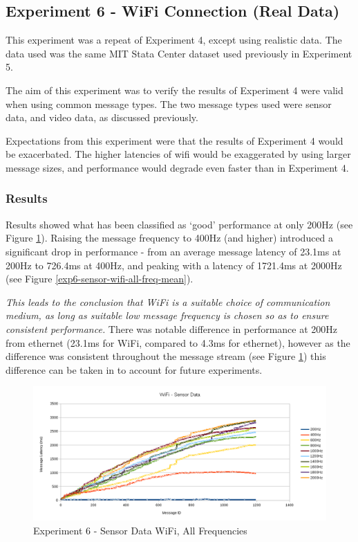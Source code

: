 \documentclass[../dissertation.tex]{subfiles}
\begin{document}
\subsection{Experiment 6 - WiFi Connection (Real Data)}

This experiment was a repeat of Experiment 4, except using realistic data. The data used was the same MIT Stata Center dataset used previously in Experiment 5.

The aim of this experiment was to verify the results of Experiment 4 were valid when using common message types. The two message types used were sensor data, and video data, as discussed previously.

Expectations from this experiment were that the results of Experiment 4 would be exacerbated. The higher latencies of wifi would be exaggerated by using larger message sizes, and performance would degrade even faster than in Experiment 4.

\subsubsection{Results}

Results showed what has been classified as `good' performance at only 200Hz (see Figure \ref{exp6-sensor-wifi-all-freq-stream}). Raising the message frequency to 400Hz (and higher) introduced a significant drop in performance - from an average message latency of 23.1ms at 200Hz to 726.4ms at 400Hz, and peaking with a latency of 1721.4ms at 2000Hz (see Figure \ref{exp6-sensor-wifi-all-freq-mean}).

\textit{This leads to the conclusion that WiFi is a suitable choice of communication medium, as long as suitable low message frequency is chosen so as to ensure consistent performance.} There was notable difference in performance at 200Hz from ethernet (23.1ms for WiFi, compared to 4.3ms for ethernet), however as the difference was consistent throughout the message stream (see Figure \ref{exp6-sensor-wifi-all-freq-stream}) this difference can be taken in to account for future experiments.

\begin{figure}[H]
\centering
\includegraphics[width=\textwidth]{images/experiment6/sensor_data_wifi_all_freqs_stream.png}
\caption{Experiment 6 - Sensor Data WiFi, All Frequencies}
\label{exp6-sensor-wifi-all-freq-stream}
\end{figure}
\end{document}
